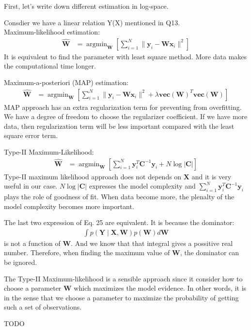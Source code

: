 \documentclass[12pt]{article}
\newenvironment{question}[2][Question]{\begin{trivlist}
\kern10pt
\item[\hskip \labelsep {\bfseries #1}\hskip \labelsep {\bfseries #2.}]}{\end{trivlist}}
\begin{document}
\begin{question}{14}
First, let's write down different estimation in log-space.

Consdier we have a linear relation Y(X) mentioned in Q13.
\\ 
Maximum-likelihood estimation:
\begin{align*}
  \hat{\mathbf{W}} 
  &= \operatorname{argmin}_{\mathbf{W}}
    [\sum_{i=1}^{N} \| \mathbf{y}_i - \mathbf{W}\mathbf{x}_i\|^2]
\end{align*}
It is equivalent to find the parameter with least square method. More data makes
the computational time longer.

Maximum-a-posteriori (MAP) estimation:
\begin{align*}
  \hat{\mathbf{W}} 
  &= \operatorname{argmin}_{\mathbf{W}}
    [\sum_{i=1}^{N} \| \mathbf{y}_i - \mathbf{W}\mathbf{x}_i\|^2
      + \lambda \textbf{vec}(\textbf{W})^T\textbf{vec}(\textbf{W})]
\end{align*}
MAP approach has an extra regularization term for preventing from overfitting.
We have a degree of freedom to choose the regularizer coefficient.
If we have more data, then regularization term will be less important compared
with the least square error term.

Type-II Maximum-Likelihood:
\begin{align*}
  \hat{\mathbf{W}} 
  &= \operatorname{argmin}_{\mathbf{W}}
    [\sum_{i=1}^{N} \mathbf{y}_i^T \mathbf{C}^{-1}\mathbf{y}_i
      + N\log{|\mathbf{C}|}]
\end{align*}
Type-II maximum likelihood approach does not depends on $\mathbf{X}$ and it is
very useful in our case. $N\log{|\mathbf{C}|}$ expresses the model complexity
and $\sum_{i=1}^{N} \mathbf{y}_i^T \mathbf{C}^{-1}\mathbf{y}_i$ plays the role of
goodness of fit. When data become more, the plenalty of the model complexity becomes
more important.
  
The last two expression of Eq. 25 are equivalent. It is because the dominator:
  \begin{align*} %
    \int p(\mathbf{Y}\mid\mathbf{X}, \mathbf{W})p(\mathbf{W})d\mathbf{W}
  \end{align*}
is not a function of $\mathbf{W}$. And we know that that integral gives a possitive
 real number. Therefore, when finding the maximum value of $\mathbf{W}$, the dominator 
 can be ignored.

The Type-II Maximum-likelihood is a sensible approach since it consider how to
 choose a parameter $\mathbf{W}$ which maximizes the model evidence. In other words,
 it is in the sense that we choose a parameter to maximize the probability of 
 getting such a set of observations.
\end{question}
\begin{question}{15}
  TODO
\end{question}  

\end{document}
